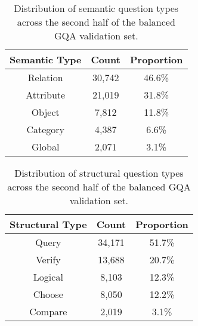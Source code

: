 
\begin{table}[htbp]
    \centering
    \begin{tabular}{ccc}
        \toprule
        \textbf{Semantic Type} & \textbf{Count} & \textbf{Proportion}\\
        \midrule
        Relation & 30,742& 46.6\%\\
        Attribute & 21,019 & 31.8\%\\
        Object & 7,812 & 11.8\%\\
        Category & 4,387 & 6.6\%\\
        Global & 2,071 & 3.1\%\\
        \bottomrule
    \end{tabular}
    \caption[GQA semantic question type distribution.]{Distribution of semantic question types across the second half of the balanced GQA validation set.}
    \label{tab:test_semantic_type_distribution}
\end{table}

\begin{table}[htbp]
    \centering
    \begin{tabular}{ccc}
        \toprule
        \textbf{Structural Type} & \textbf{Count} & \textbf{Proportion}\\
        \midrule
        Query & 34,171 & 51.7\%\\
        Verify & 13,688 & 20.7\%\\
        Logical & 8,103 & 12.3\%\\
        Choose & 8,050 & 12.2\%\\
        Compare & 2,019 & 3.1\%\\
        \bottomrule
    \end{tabular}
    \caption[GQA structural question type distribution.]{Distribution of structural question types across the second half of the balanced GQA validation set.}
    \label{tab:test_structural_type_distribution}
\end{table}

